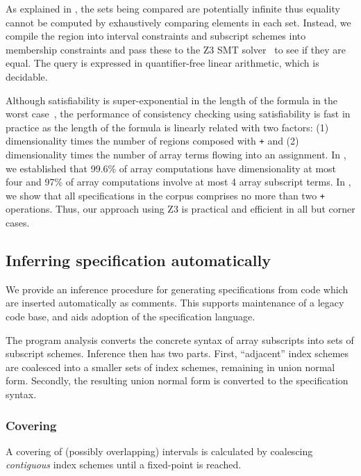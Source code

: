 As explained in , the sets being compared are
potentially infinite thus equality cannot be computed by exhaustively
comparing elements in each set. Instead, we compile the region into
interval constraints and subscript schemes into membership constraints and pass
these to the \textsc{Z3} SMT solver~\citep{de2008z3} to see if they are equal. The
query is expressed in quantifier-free linear arithmetic, which is decidable.

Although satisfiability is super-exponential in the length of the formula in
the worst case~\cite{fischer1974super}, the performance of consistency checking
using satisfiability is fast in practice as the length of the formula is linearly
related with two factors: (1) dimensionality times the number of regions composed
with \texttt{+} and (2) dimensionality times the number of array terms flowing
into an assignment. In , we
established that 99.6\% of array computations have 
dimensionality at most four and 97\% of array computations
involve at most 4 array subscript terms. In
, we show that all specifications in the corpus
comprises no more than two \texttt{+} operations. Thus, our approach
using Z3 is practical and efficient in all but corner cases.


\subsection{Inferring specification automatically}
\label{subsec:inference}
%
\noindent
We provide an inference procedure for generating specifications from
code which are inserted automatically as comments. This supports
maintenance of a legacy code base, and aids adoption of the
specification language. 

The program analysis converts the concrete syntax of
array subscripts into sets of subscript schemes. Inference then has
two parts. First, ``adjacent'' index schemes are coalesced into a
smaller sets of index schemes, remaining in union normal
form. Secondly, the resulting union normal form is converted to the
specification syntax.

\subsubsection{Covering}
A covering of (possibly overlapping) intervals is calculated
by coalescing \emph{contiguous} index schemes
until a fixed-point is reached.

